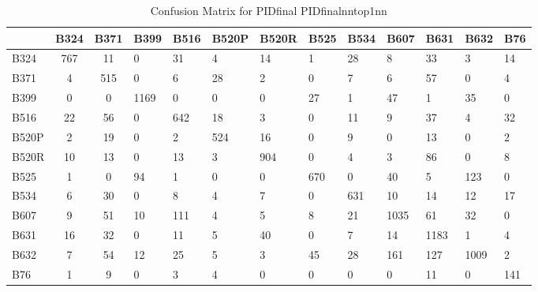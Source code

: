\begin{table}[htbp]
\centering
\caption{Confusion Matrix for PIDfinal PIDfinalnntop1nn}
\label{tab:confusionmatrix.PIDfinal.PIDfinalnntop1nn}
\begin{tabular}{|l|cc|}
\toprule
 & B324 & B371 & B399 & B516 & B520P & B520R & B525 & B534 & B607 & B631 & B632 & B76 \\
\midrule
B324 & 767 & 11 & 0 & 31 & 4 & 14 & 1 & 28 & 8 & 33 & 3 & 14 \\
B371 & 4 & 515 & 0 & 6 & 28 & 2 & 0 & 7 & 6 & 57 & 0 & 4 \\
B399 & 0 & 0 & 1169 & 0 & 0 & 0 & 27 & 1 & 47 & 1 & 35 & 0 \\
B516 & 22 & 56 & 0 & 642 & 18 & 3 & 0 & 11 & 9 & 37 & 4 & 32 \\
B520P & 2 & 19 & 0 & 2 & 524 & 16 & 0 & 9 & 0 & 13 & 0 & 2 \\
B520R & 10 & 13 & 0 & 13 & 3 & 904 & 0 & 4 & 3 & 86 & 0 & 8 \\
B525 & 1 & 0 & 94 & 1 & 0 & 0 & 670 & 0 & 40 & 5 & 123 & 0 \\
B534 & 6 & 30 & 0 & 8 & 4 & 7 & 0 & 631 & 10 & 14 & 12 & 17 \\
B607 & 9 & 51 & 10 & 111 & 4 & 5 & 8 & 21 & 1035 & 61 & 32 & 0 \\
B631 & 16 & 32 & 0 & 11 & 5 & 40 & 0 & 7 & 14 & 1183 & 1 & 4 \\
B632 & 7 & 54 & 12 & 25 & 5 & 3 & 45 & 28 & 161 & 127 & 1009 & 2 \\
B76 & 1 & 9 & 0 & 3 & 4 & 0 & 0 & 0 & 0 & 11 & 0 & 141 \\
\bottomrule
\end{tabular}
\end{table}
